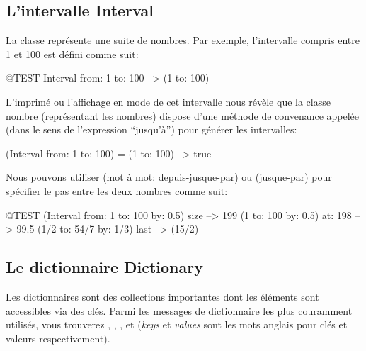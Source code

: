 \documentclass[a4paper,10pt,twoside]{book}
\begin{document}

\subsection{L'intervalle Interval}
La classe  représente une suite de nombres.
Par exemple, l'intervalle compris entre 1 et 100 est défini comme
suit:
\begin{code}{@TEST}
Interval from: 1 to: 100 --> (1 to: 100)
\end{code}

\noindent
L'imprimé ou l'affichage en mode  de
cet intervalle nous révèle que la classe nombre  (représentant les nombres) dispose d'une méthode de convenance appelée  (dans le sens de l'expression ``jusqu'à'') pour générer les intervalles:

\begin{code}{}
(Interval from: 1 to: 100) = (1 to: 100) --> true
\end{code}

Nous pouvons utiliser  (mot à mot: depuis-jusque-par) ou
 (jusque-par) pour spécifier le pas entre les deux nombres comme suit:

\begin{code}{@TEST}
(Interval from: 1 to: 100 by: 0.5) size --> 199
(1 to: 100 by: 0.5) at: 198 --> 99.5
(1/2 to: 54/7 by: 1/3) last --> (15/2)
\end{code}

\subsection{Le dictionnaire Dictionary}
Les dictionnaires sont des collections importantes dont les éléments
sont accessibles via des clés.
Parmi les messages de dictionnaire les plus couramment utilisés, vous trouverez  
, , ,  et  (\emph{keys} et \emph{values} sont les mots anglais pour clés et valeurs respectivement).
\end{document}
